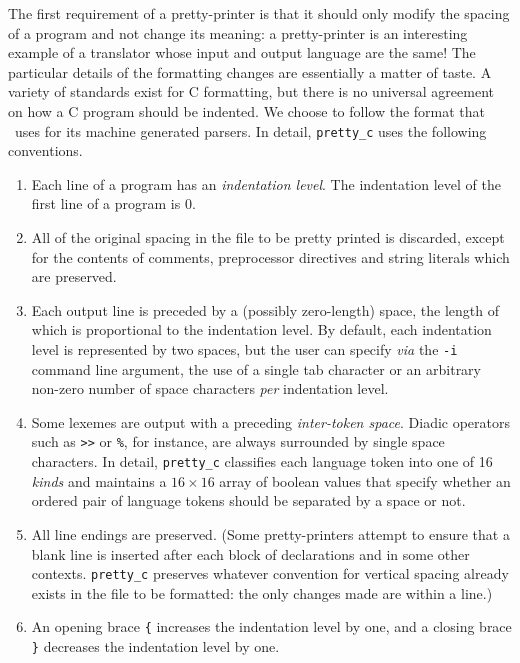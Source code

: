 The first requirement of a pretty-printer is that it should only modify
the spacing of a program and not change its meaning: a pretty-printer is
an interesting example of a translator whose input and output language
are the same! The particular details of the formatting changes are
essentially a matter of taste. A variety of standards exist for C
formatting, but there is no universal agreement on how a C program
should be indented. We choose to follow the format that \rdp\ uses
for its machine generated parsers. In detail, \verb+pretty_c+ uses the following conventions.
\begin{enumerate}

\item Each line of a program has an {\em indentation level}. The indentation level
of the first line of a program is 0.

\item All of the original spacing in the file to be pretty printed is discarded, 
except for the contents of comments, preprocessor directives and string literals which are preserved.

\item Each output line is preceded by a (possibly zero-length) space,
the length of which is proportional to the indentation level. By
default, each indentation level is represented by two  spaces, but the
user can specify {\em via} the \verb+-i+ command line argument, the use
of a single tab character or an arbitrary non-zero number of space
characters {\em per} indentation level.

\item Some lexemes are output with a preceding {\em inter-token space}.
Diadic operators such as \verb+>>+ or \verb+%+, for instance, are
always surrounded by single  space characters. In detail,
\verb+pretty_c+ classifies each language token into one of 16 {\em
kinds} and maintains a $16\times16$ array of boolean values that specify
whether an ordered pair of language tokens should be separated by a space or not.

\item All line endings are preserved. (Some pretty-printers attempt to
ensure that a blank line is inserted after each block of declarations and in 
some other contexts. \verb+pretty_c+ preserves whatever convention for vertical
spacing already exists in the file to be formatted: the only changes
made are within a line.)

\item An opening brace \verb+{+ increases the indentation level by one, and a closing
brace \verb+}+ decreases the indentation level by one.


\end{enumerate}
